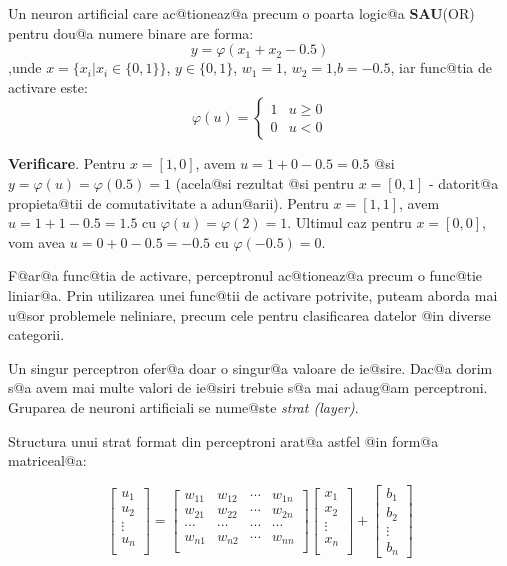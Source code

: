 \begin{exemplu}

	Un neuron artificial care ac@tioneaz@a precum o poarta logic@a {\bf SAU}(OR) pentru dou@a numere binare are forma:
$$
	y = \varphi ( x_1 + x_2 - 0.5 )
$$
,unde $x = \{ x_i | x_i \in \{0, 1\} \}$, $y \in \{0, 1\}$, $w_1 = 1$, $w_2 = 1$,$b = -0.5$, iar func@tia de activare este: 
$$
	\varphi ( u ) = \left\lbrace
		\begin{array}{lc}
			1 & u \geq 0 \\
			0 & u < 0
		\end{array}
	\right.
$$
\end{exemplu}

{\bf Verificare}. Pentru $x = [1, 0]$, avem $u = 1 + 0 - 0.5 = 0.5$ @si $y = \varphi(u) = \varphi(0.5) = 1$ (acela@si rezultat @si pentru $x = [0, 1]$ - datorit@a propieta@tii de comutativitate a adun@arii).
Pentru $x = [1, 1]$, avem $u = 1 + 1 - 0.5 = 1.5$ cu $\varphi (u) = \varphi ( 2 ) = 1$. Ultimul caz pentru $x = [0, 0]$, vom avea $u = 0 + 0 - 0.5 = -0.5$ cu $\varphi (-0.5) = 0$.

\begin{observatia}
	F@ar@a func@tia de activare, perceptronul ac@tioneaz@a precum o func@tie liniar@a. Prin utilizarea unei func@tii de activare potrivite, puteam aborda mai u@sor problemele neliniare, precum cele pentru clasificarea datelor @in diverse categorii.
\end{observatia}

Un singur perceptron ofer@a doar o singur@a valoare de ie@sire. Dac@a dorim s@a avem mai multe valori de ie@siri trebuie s@a mai adaug@am perceptroni. Gruparea de neuroni artificiali se nume@ste {\sl strat (layer)}.

Structura unui strat format din perceptroni arat@a astfel @in form@a matriceal@a:

$$
	\begin{bmatrix}
		u_1 \\
		u_2 \\
		\vdots \\ 
		u_n \\
	\end{bmatrix}	
	= 
	\begin{bmatrix}
		w_{11} & w_{12} & \cdots & w_{1n} \\
		w_{21} & w_{22} & \cdots & w_{2n} \\
		\cdots & \cdots & \cdots & \cdots \\
		w_{n1} & w_{n2} & \cdots & w_{nn} \\
	\end{bmatrix}
	\begin{bmatrix}
		x_1 \\
		x_2 \\
		\vdots \\
		x_n \\
	\end{bmatrix}
	+
	\begin{bmatrix}
		b_1 \\
		b_2 \\
		\vdots \\
		b_n
	\end{bmatrix}
$$

